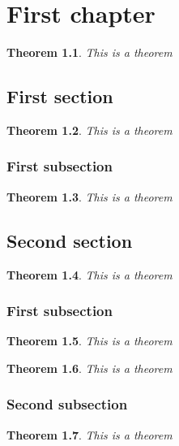 \documentclass{book}
\newtheorem{theorem}{Theorem}
\begin{document}
\chapter{First chapter}

\begin{theorem} This is a theorem \end{theorem}


\section{First section}

\begin{theorem} This is a theorem \end{theorem}


\subsection{First subsection}

\begin{theorem} This is a theorem \end{theorem}


\section{Second section}

\begin{theorem} This is a theorem \end{theorem}


\subsection{First subsection}

\begin{theorem} This is a theorem \end{theorem}

\begin{theorem} This is a theorem \end{theorem}


\subsection{Second subsection}

\begin{theorem} This is a theorem \end{theorem}
\end{document}
